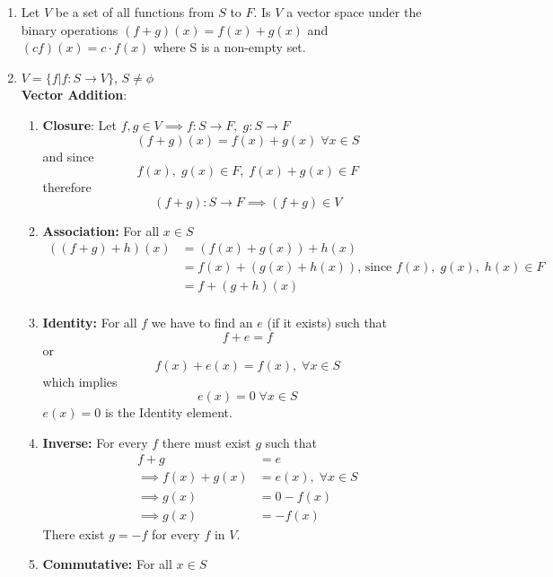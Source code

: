 \documentclass[a4paper, titlepage]{article}
\begin{document}
\begin{enumerate}[label=\textbf{\arabic*.}]
    \item Let $V$ be a set of all functions from $S$ to $F$. Is $V$ a
    vector space under the binary operations
    $ (f + g)(x) = f(x) + g(x) $ and $ (cf)(x) = c\cdot f(x) $ where S is
    a non-empty set.
    \item[] $ V = \{ f \left. \right\vert f: S \rightarrow V \}$, $S \neq \phi$ \hfill \\ 
    \textbf{Vector Addition}:
    \begin{enumerate}[label=\textbf{\alph*}]
        \item \textbf{Closure}: 
        Let $f, g \in V \implies f: S \rightarrow F,\; g: S \rightarrow F$
        $$(f + g)(x) = f(x) + g(x) \; \forall x \in S$$
        and since 
        $$f(x), \; g(x) \in F, \; f(x) + g(x) \in F$$
        therefore 
        $$(f + g): S \rightarrow F \implies (f+g) \in V$$
        \item \textbf{Association: } For all $x \in S$
        \begin{align*}
            \left( (f + g) + h \right)(x) &= \left( f(x) + g(x) \right) + h(x) \\
                       &= f(x) + \left( g(x) +h(x) \right) \text{, since } f(x), \; g(x), \; h(x) \in F \\ 
                       &= f + (g + h)(x) \\
        \end{align*}
        \item \textbf{Identity: }
        For all $f$ we have to find an $e$ (if it exists) such that
        $$ f + e = f $$
        or
        $$ f(x) + e(x) = f(x), \; \forall x \in S $$
        which implies
        $$ e(x) = 0 \; \forall x \in S $$
        $e(x) = 0$ is the Identity element.
        \item \textbf{Inverse: } For every $f$ there must exist $g$
        such that 
        \begin{align*}
            f + g &= e \\
            \implies f(x) + g(x) &= e(x), \; \forall x \in S \\ 
            \implies g(x) &= 0 - f(x) \\ 
            \implies g(x) &= -f(x) 
        \end{align*}
        There exist $g = -f$ for every $f$ in $V$.
        \item \textbf{Commutative: } For all $x \in S$ 
        \begin{align*}

\end{align*}
\end{enumerate}
\end{enumerate}
\end{document}
